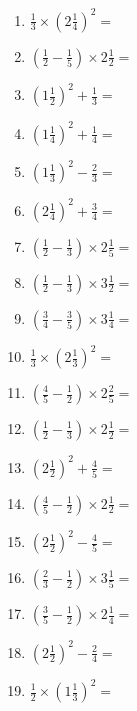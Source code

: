 \documentclass[12pt]{article}
\begin{document}
\begin{enumerate}
\item \large $ \frac{1}{3} \times \left( 2 \frac{1}{4} \right)^2 = $ \vspace{1.6cm}
\item \large $ \left( \frac{1}{2} - \frac{1}{5} \right) \times 2 \frac{1}{2} = $ \vspace{1.6cm}
\item \large $ \left( 1 \frac{1}{2} \right)^2 + \frac{1}{3} = $ \vspace{1.6cm}
\item \large $ \left( 1 \frac{1}{4} \right)^2 + \frac{1}{4} = $ \vspace{1.6cm}
\item \large $ \left( 1 \frac{1}{3} \right)^2 - \frac{2}{3} = $ \vspace{1.6cm}
\item \large $ \left( 2 \frac{1}{4} \right)^2 + \frac{3}{4} = $ \vspace{1.6cm}
\item \large $ \left( \frac{1}{2} - \frac{1}{3} \right) \times 2 \frac{1}{5} = $ \vspace{1.6cm}
\item \large $ \left( \frac{1}{2} - \frac{1}{3} \right) \times 3 \frac{1}{2} = $ \vspace{1.6cm}
\item \large $ \left( \frac{3}{4} - \frac{3}{5} \right) \times 3 \frac{1}{4} = $ \vspace{1.6cm}
\newpage
\item \large $ \frac{1}{3} \times \left( 2 \frac{1}{3} \right)^2 = $ \vspace{1.6cm}
\item \large $ \left( \frac{4}{5} - \frac{1}{2} \right) \times 2 \frac{2}{5} = $ \vspace{1.6cm}
\item \large $ \left( \frac{1}{2} - \frac{1}{3} \right) \times 2 \frac{1}{2} = $ \vspace{1.6cm}
\item \large $ \left( 2 \frac{1}{2} \right)^2 + \frac{4}{5} = $ \vspace{1.6cm}
\item \large $ \left( \frac{4}{5} - \frac{1}{2} \right) \times 2 \frac{1}{2} = $ \vspace{1.6cm}
\item \large $ \left( 2 \frac{1}{2} \right)^2 - \frac{4}{5} = $ \vspace{1.6cm}
\item \large $ \left( \frac{2}{3} - \frac{1}{2} \right) \times 3 \frac{1}{5} = $ \vspace{1.6cm}
\item \large $ \left( \frac{3}{5} - \frac{1}{2} \right) \times 2 \frac{1}{4} = $ \vspace{1.6cm}
\item \large $ \left( 2 \frac{1}{2} \right)^2 - \frac{2}{4} = $ \vspace{1.6cm}
\item \large $ \frac{1}{2} \times \left( 1 \frac{1}{3} \right)^2 = $ \vspace{1.6cm}
\end{enumerate}\newpage
\end{document}
